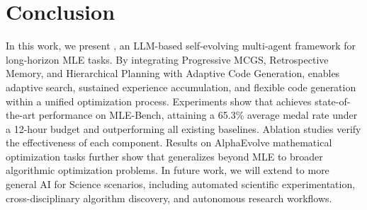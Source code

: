 
\section{Conclusion}
\label{sec:conclusion}

In this work, we present \sname, an LLM-based self-evolving multi-agent framework for long-horizon MLE tasks. By integrating Progressive MCGS, Retrospective Memory, and Hierarchical Planning with Adaptive Code Generation, \sname enables adaptive search, sustained experience accumulation, and flexible code generation within a unified optimization process. Experiments show that \sname achieves state-of-the-art performance on MLE-Bench, attaining a 65.3\% average medal rate under a 12-hour budget and outperforming all existing baselines. Ablation studies verify the effectiveness of each component. Results on AlphaEvolve mathematical optimization tasks further show that \sname generalizes beyond MLE to broader algorithmic optimization problems. In future work, we will extend \sname to more general AI for Science scenarios, including automated scientific experimentation, cross-disciplinary algorithm discovery, and autonomous research workflows.
